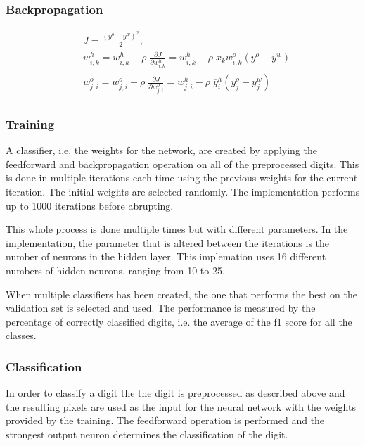 \documentclass[report.tex]{subfile}
\begin{document}
\subsubsection{Backpropagation}
\begin{align*}
    &J = \frac{(y^o - y^w)^2}{2}, \\
    &w^h_{i,k} = w^h_{i,k} - \rho \; \frac{\partial J}{\partial w^h_{i,k}}
               = w^h_{i,k} - \rho \; x_k w^o_{i,k}(y^o - y^w)\\
    &w^o_{j,i} = w^o_{j,i} - \rho \; \frac{\partial J}{\partial w^o_{j,i}}
               = w^h_{j,i} - \rho \; \overline y^h_i (y^o_j - y^w_j)\\
\end{align*}

\subsubsection{Training}
A classifier, i.e. the weights for the network, are created by applying the
feedforward and backpropagation operation on all of the preprocessed digits.
This is done in multiple iterations each time using the previous weights for
the current iteration. The initial weights are selected randomly. The
implementation performs up to 1000 iterations before abrupting.

This whole process is done multiple times but with different parameters. In the
implementation, the parameter that is altered between the iterations is the
number of neurons in the hidden layer. This implemation uses 16 different
numbers of hidden neurons, ranging from 10 to 25. 

When multiple classifiers has been created, the one that performs the best on
the validation set is selected and used. The performance is measured by the
percentage of correctly classified digits, i.e. the average of the f1 score for
all the classes.

\subsubsection{Classification}
In order to classify a digit the the digit is preprocessed as described above
and the resulting pixels are used as the input for the neural network with the
weights provided by the training. The feedforward operation is performed and
the strongest output neuron determines the classification of the digit.
\end{document}
